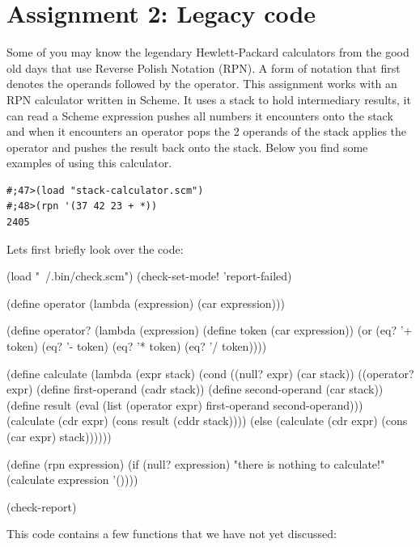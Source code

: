 \documentclass[12pt,a4paper,english,twoside]{article}
\begin{document}
\section{Assignment 2: Legacy code}
Some of you may know the legendary Hewlett-Packard calculators from the good 
old days that use Reverse Polish Notation (RPN). A form of notation that first 
denotes the operands followed by the operator. This assignment works with an
RPN calculator written in Scheme. It uses a stack to hold intermediary 
results, it can read a Scheme expression pushes all numbers it encounters onto 
the stack and when it encounters an operator pops the 2 operands of the stack 
applies the operator and pushes the result back onto the stack. Below you find 
some examples of using this calculator.
\begin{lstlisting}
#;47>(load "stack-calculator.scm")
#;48>(rpn '(37 42 23 + *))
2405
\end{lstlisting}
\vfill
\pagebreak
Lets first briefly look over the code:
\begin{schemecode}
(load "~/.bin/check.scm")
(check-set-mode! 'report-failed)

(define operator
  (lambda (expression) 
    (car expression)))

(define operator? 
  (lambda (expression)
    (define token (car expression))
    (or (eq? '+ token)
        (eq? '- token)
        (eq? '* token)
        (eq? '/ token))))

(define calculate (lambda (expr stack)
    (cond ((null? expr) (car stack))
          ((operator? expr)
            (define first-operand (cadr stack))
            (define second-operand (car stack))
            (define result (eval (list 
                                   (operator expr) 
                                   first-operand 
                                   second-operand)))
            (calculate (cdr expr) (cons result (cddr stack))))
          (else (calculate (cdr expr) (cons (car expr) stack))))))

(define (rpn expression)
    (if (null? expression)
      "there is nothing to calculate!"
      (calculate expression '())))

(check-report)
\end{schemecode}
This code contains a few functions that we have not yet discussed:
\end{document}
